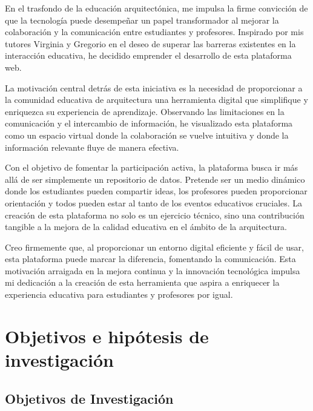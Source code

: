 \documentclass[a4paper, 12pt]{book}
\begin{document}
En el trasfondo de la educación arquitectónica, me impulsa la firme convicción de que la tecnología puede desempeñar un papel transformador al mejorar la colaboración y la comunicación entre estudiantes y profesores. Inspirado por mis tutores Virginia y Gregorio en el deseo de superar las barreras existentes en la interacción educativa, he decidido emprender el desarrollo de esta plataforma web.

La motivación central detrás de esta iniciativa es la necesidad de proporcionar a la comunidad educativa de arquitectura una herramienta digital que simplifique y enriquezca su experiencia de aprendizaje. Observando las limitaciones en la comunicación y el intercambio de información, he visualizado esta plataforma como un espacio virtual donde la colaboración se vuelve intuitiva y donde la información relevante fluye de manera efectiva.

Con el objetivo de fomentar la participación activa, la plataforma busca ir más allá de ser simplemente un repositorio de datos. Pretende ser un medio dinámico donde los estudiantes pueden compartir ideas, los profesores pueden proporcionar orientación y todos pueden estar al tanto de los eventos educativos cruciales. La creación de esta plataforma no solo es un ejercicio técnico, sino una contribución tangible a la mejora de la calidad educativa en el ámbito de la arquitectura.

Creo firmemente que, al proporcionar un entorno digital eficiente y fácil de usar, esta plataforma puede marcar la diferencia, fomentando la comunicación. Esta motivación arraigada en la mejora continua y la innovación tecnológica impulsa mi dedicación a la creación de esta herramienta que aspira a enriquecer la experiencia educativa para estudiantes y profesores por igual.
\section{Objetivos e hipótesis de investigación}
\label{sec:seccion}

\subsection{Objetivos de Investigación}
\label{subsec:Objetivos de Investigación}
\end{document}
